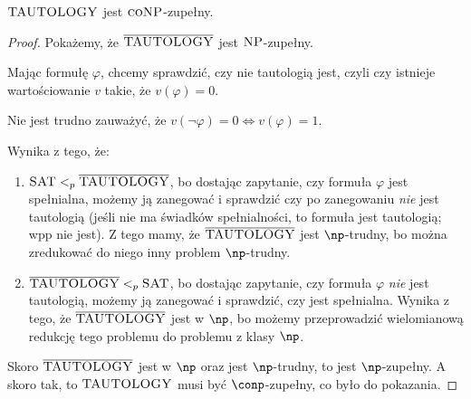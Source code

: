 \begin{theorem}
    \( \textsc{TAUTOLOGY} \) jest \( \textsc{coNP} \)-zupełny.
\end{theorem}
\begin{proof}
    Pokażemy, że \( \overline{\textsc{TAUTOLOGY}} \) jest \( \textsc{NP} \)-zupełny.
    
    Mając formułę \( \varphi \), chcemy sprawdzić, czy nie tautologią jest, czyli czy istnieje wartościowanie \( v \) takie, że \( v(\varphi) = 0 \). 
    
    Nie jest trudno zauważyć, że \( v(\lnot \varphi) = 0 \iff v(\varphi) = 1 \).
    
    Wynika z tego, że:
    \begin{enumerate}
        \item \( \textsc{SAT} <_p \overline{\textsc{TAUTOLOGY}}\), bo dostając zapytanie, czy formuła \( \varphi \) jest spełnialna, możemy ją zanegować i sprawdzić czy po zanegowaniu \textit{nie} jest tautologią (jeśli nie ma świadków spełnialności, to formuła jest tautologią; wpp nie jest). Z tego mamy, że \(\overline{\textsc{TAUTOLOGY}}\) jest \(\np\)-trudny, bo można zredukować do niego inny problem \(\np\)-trudny.
        \item \(\overline{\textsc{TAUTOLOGY}} <_p \textsc{SAT} \), bo dostając zapytanie, czy formuła \( \varphi \) \textit{nie} jest tautologią, możemy ją zanegować i sprawdzić, czy jest spełnialna. Wynika z tego, że \(\overline{\textsc{TAUTOLOGY}}\) jest w \(\np\), bo możemy przeprowadzić wielomianową redukcję tego problemu do problemu z klasy \(\np\). 
    \end{enumerate}
    
    Skoro \(\overline{\textsc{TAUTOLOGY}}\) jest w \(\np\) oraz jest \(\np\)-trudny, to jest \(\np\)-zupełny. A skoro tak, to \(\textsc{TAUTOLOGY}\) musi być \(\conp\)-zupełny, co było do pokazania. 
\end{proof}